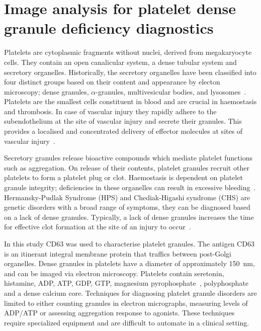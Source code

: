 \chapter{Image analysis for platelet dense granule deficiency diagnostics}
\ifpdf
    \graphicspath{{chapter_3/figs/}}
\fi

Platelets are cytoplasmic fragments without nuclei, derived from megakaryocyte cells. They contain an open canalicular system, a dense tubular system and secretory organelles. Historically, the secretory organelles have been classified into four distinct groups based on their content and appearance by electon microscopy; dense granules, $\alpha$-granules, multivesicular bodies, and lysosomes~\cite{VanNispenTotPannerden2010}. Platelets are the smallest cells constituent in blood and are crucial in haemostasis and thrombosis. In case of vascular injury they rapidly adhere to the subendothelium at the site of vascular injury and secrete their granules. This provides a localised and concentrated delivery of effector molecules at sites of vascular injury~\cite{Reed2000}.

Secretory granules release bioactive compounds which mediate platelet functions such as aggregation. On release of their contents, platelet granules recruit other platelets to form a platelet plug or clot. Haemostasis is dependent on platelet granule integrity; deficiencies in these organelles can result in excessive bleeding~\cite{Nurden2014}. Hermansky-Pudlak Syndrome (HPS) and Chediak-Higashi syndrome (CHS) are genetic disorders with a broad range of symptoms, they can be diagnosed based on a lack of dense granules. Typically, a lack of dense granules increases the time for effective clot formation at the site of an injury to occur~\cite{Seward2013}.

In this study CD63 was used to characterise platelet granules. The antigen CD63 is an itinerant integral membrane protein that traffics between post-Golgi organelles. Dense granules in platelets have a diameter of approximately \SI{150}{\nano\meter}, and can be imaged via electron microscopy. Platelets contain seretonin, histamine, ADP, ATP, GDP, GTP, magnesium pyrophosphate~\cite{Rendu2001}, polyphosphate~\cite{Ruiz2004} and a dense calcium core. Techniques for diagnosing platelet granule disorders are limited to either counting granules in electron micrographs, measuring levels of ADP/ATP or assessing aggregation response to agonists. These techniques require specialized equipment and are difficult to automate in a clinical setting.

